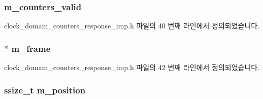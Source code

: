 \subsubsection[{\texorpdfstring{m\+\_\+counters\+\_\+valid}{m_counters_valid}}]{ m\+\_\+counters\+\_\+valid\hspace{0.3cm}{\ttfamily [private]}}\hypertarget{classavdecc__lib_1_1clock__domain__counters__response__imp_ab528aa8ed91b0a6453238e605c451ce8}{}\label{classavdecc__lib_1_1clock__domain__counters__response__imp_ab528aa8ed91b0a6453238e605c451ce8}


clock\+\_\+domain\+\_\+counters\+\_\+response\+\_\+imp.\+h 파일의 40 번째 라인에서 정의되었습니다.

\subsubsection[{\texorpdfstring{m\+\_\+frame}{m_frame}}]{$\ast$ m\+\_\+frame\hspace{0.3cm}{\ttfamily [private]}}\hypertarget{classavdecc__lib_1_1clock__domain__counters__response__imp_a50417969cf438e7c8d698726bbbe2ff9}{}\label{classavdecc__lib_1_1clock__domain__counters__response__imp_a50417969cf438e7c8d698726bbbe2ff9}


clock\+\_\+domain\+\_\+counters\+\_\+response\+\_\+imp.\+h 파일의 42 번째 라인에서 정의되었습니다.

\subsubsection[{\texorpdfstring{m\+\_\+position}{m_position}}]{\setlength{\rightskip}{0pt plus 5cm}ssize\+\_\+t m\+\_\+position\hspace{0.3cm}{\ttfamily [private]}}\hypertarget{classavdecc__lib_1_1clock__domain__counters__response__imp_af5e691c4a8a0feb07f48440b321206cd}{}\label{classavdecc__lib_1_1clock__domain__counters__response__imp_af5e691c4a8a0feb07f48440b321206cd}



